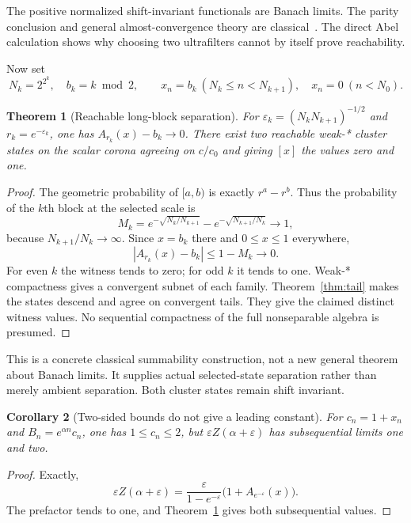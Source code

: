 \documentclass[11pt]{article}
\newtheorem{theorem}{Theorem}[section]
\newtheorem{corollary}[theorem]{Corollary}
\theoremstyle{definition}
\newcommand{\eps}{\varepsilon}
\begin{document}
The positive normalized shift-invariant functionals are Banach limits.
The parity conclusion and general almost-convergence theory are classical~\cite[Section 1]{Lorentz1948}.
The direct Abel calculation shows why choosing two ultrafilters cannot by itself prove reachability.

Now set
\begin{equation}
 N_k=2^{2^k},\quad b_k=k\bmod2,\qquad
 x_n=b_k\ (N_k\leq n<N_{k+1}),\quad x_n=0\ (n<N_0).
 \label{eq:block-witness}
\end{equation}

\begin{theorem}[Reachable long-block separation]
\label{thm:blocks}
For $\eps_k=(N_kN_{k+1})^{-1/2}$ and $r_k=e^{-\eps_k}$, one has
$A_{r_k}(x)-b_k\to0$.
There exist two reachable weak-* cluster states on the scalar corona agreeing on $c/c_0$ and giving $[x]$ the values zero and one.
\end{theorem}
\begin{proof}
The geometric probability of $[a,b)$ is exactly $r^a-r^b$.
Thus the probability of the $k$th block at the selected scale is
\begin{equation}
 M_k=e^{-\sqrt{N_k/N_{k+1}}}
       -e^{-\sqrt{N_{k+1}/N_k}}\longrightarrow1,
 \label{eq:block-mass}
\end{equation}
because $N_{k+1}/N_k\to\infty$.
Since $x=b_k$ there and $0\leq x\leq1$ everywhere,
\begin{equation}
 |A_{r_k}(x)-b_k|\leq1-M_k\longrightarrow0.
 \label{eq:block-bound}
\end{equation}
For even $k$ the witness tends to zero; for odd $k$ it tends to one.
Weak-* compactness gives a convergent subnet of each family.
Theorem~\ref{thm:tail} makes the states descend and agree on convergent tails.
They give the claimed distinct witness values.
No sequential compactness of the full nonseparable algebra is presumed.
\end{proof}

This is a concrete classical summability construction, not a new general theorem about Banach limits.
It supplies actual selected-state separation rather than merely ambient separation.
Both cluster states remain shift invariant.

\begin{corollary}[Two-sided bounds do not give a leading constant]
\label{cor:no-constant}
For $c_n=1+x_n$ and $B_n=e^{\alpha n}c_n$, one has $1\leq c_n\leq2$, but $\eps Z(\alpha+\eps)$ has subsequential limits one and two.
\end{corollary}
\begin{proof}
Exactly,
\begin{equation}
 \eps Z(\alpha+\eps)=\frac{\eps}{1-e^{-\eps}}
       \bigl(1+A_{e^{-\eps}}(x)\bigr).
\end{equation}
The prefactor tends to one, and Theorem~\ref{thm:blocks} gives both subsequential values.
\end{proof}
\end{document}
